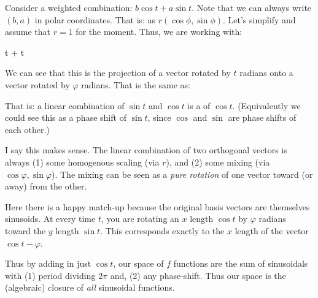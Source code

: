 Consider a weighted combination: $b \cos t + a \sin t$. Note that we can
always write $(b, a)$ in polar coordinates. That is: as $r(\cos \phi,
\sin \phi)$. Let's simplify and assume that $r = 1$ for the moment.
Thus, we are working with:

\begin{nedqn}
  \cos \varphi \cos t + \sin \varphi \sin t
\end{nedqn}

We can see that this is the projection of a vector rotated by $t$
radians onto a vector rotated by $\varphi$ radians. That is the same as:

\begin{nedqn}
  \cos{}
\end{nedqn}

That is: a linear combination of $\sin t$ and $\cos t$ is a
 of $\cos t$. (Equivalently we could see this as a
phase shift of $\sin t$, since $\cos$ and $\sin$ are phase shifts of
each other.)

I say this makes sense. The linear combination of two orthogonal vectors
is always (1) some homogenous scaling (via $r$), and (2) some mixing
(via $\cos\varphi, \sin\varphi$). The mixing can be seen as a \emph{pure
rotation} of one vector toward (or away) from the other.

Here there is a happy match-up because the original basis vectors are
themselves sinusoids. At every time $t$, you are rotating an $x$ length
$\cos t$ by $\varphi$ radians toward the $y$ length $\sin t$. This
corresponds exactly to the $x$ length of the vector $\cos t - \varphi$.

Thus by adding in just $\cos t$, our space of $f$ functions are the sum
of sinusoidals with (1) period dividing $2\pi$ and, (2) any phase-shift.
Thus our space is the (algebraic) closure of \emph{all} sinusoidal
functions.
